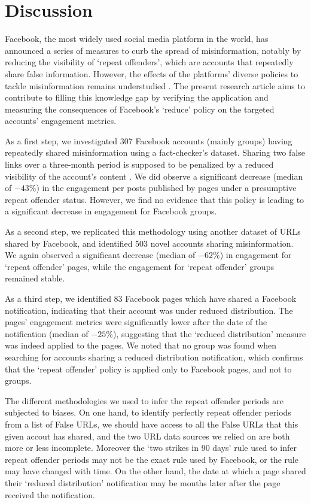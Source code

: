 \documentclass[review]{elsarticle}
\begin{document}
{\section{Discussion}

Facebook, the most widely used social media platform in the world, has announced a series of measures to curb the spread of misinformation, notably by reducing the visibility of `repeat offenders', which are accounts that repeatedly share false information. 
However, the effects of the platforms' diverse policies to tackle misinformation remains understudied \citep{pasquetto2020tackling}. 
The present research article aims to contribute to filling this knowledge gap by verifying the application and measuring the consequences of Facebook's `reduce' policy on the targeted accounts' engagement metrics.

As a first step, we investigated 307 Facebook accounts (mainly groups) having repeatedly shared misinformation using a fact-checker's dataset. 
Sharing two false links over a three-month period is supposed to be penalized by a reduced visibility of the account's content \cite{2strikes90daysRule}. 
We did observe a significant decrease (median of $-43\%$) in the engagement per posts published by pages under a presumptive repeat offender status.
However, we find no evidence that this policy is leading to a significant decrease in engagement for Facebook groups.

As a second step, we replicated this methodology using another dataset of URLs shared by Facebook, and identified 503 novel accounts sharing misinformation. 
We again observed a significant decrease (median of $-62\%$) in engagement for `repeat offender' pages, while the engagement for `repeat offender' groups remained stable.
 
As a third step, we identified 83 Facebook pages which have shared a Facebook notification, indicating that their account was under reduced distribution.
The pages' engagement metrics were significantly lower after the date of the notification (median of $-25\%$), suggesting that the `reduced distribution' measure was indeed applied to the pages.
We noted that no group was found when searching for accounts sharing a reduced distribution notification, which confirms that the `repeat offender' policy is applied only to Facebook pages, and not to groups.

The different methodologies we used to infer the repeat offender periods are subjected to biases.
On one hand, to identify perfectly repeat offender periods from a list of False URLs, we should have access to all the False URLs that this given accout has shared, and the two URL data sources we relied on are both more or less incomplete.
Moreover the `two strikes in 90 days' rule used to infer repeat offender periods may not be the exact rule used by Facebook, or the rule may have changed with time.
On the other hand, the date at which a page shared their `reduced distribution' notification may be months later after the page received the notification.

}
\end{document}

